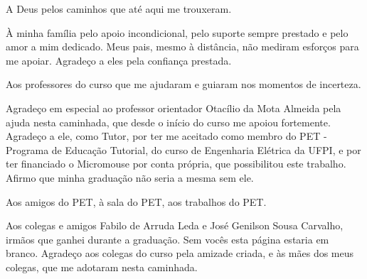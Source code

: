 

A Deus pelos caminhos que até aqui me trouxeram.

À minha família pelo apoio incondicional, pelo suporte sempre prestado e pelo amor a mim dedicado. Meus pais, mesmo à distância, não mediram esforços para me apoiar. Agradeço a eles pela confiança prestada.


Aos professores do curso que me ajudaram e guiaram nos momentos de incerteza.

Agradeço em especial ao professor orientador Otacílio da Mota Almeida pela ajuda nesta caminhada, que desde o início do curso me apoiou fortemente. Agradeço a ele, como Tutor, por ter me aceitado como membro do PET - Programa de Educação Tutorial, do curso de Engenharia Elétrica da UFPI, e por ter financiado o Micromouse por conta própria, que possibilitou este trabalho. Afirmo que minha graduação não seria a mesma sem ele.

Aos amigos do PET, à sala do PET, aos trabalhos do PET.

Aos colegas e amigos Fabilo de Arruda Leda e José Genilson Sousa Carvalho, irmãos que ganhei durante a graduação. Sem vocês esta página estaria em branco. Agradeço aos colegas do curso pela amizade criada, e às mães dos meus colegas, que me adotaram nesta caminhada.




\newpage

